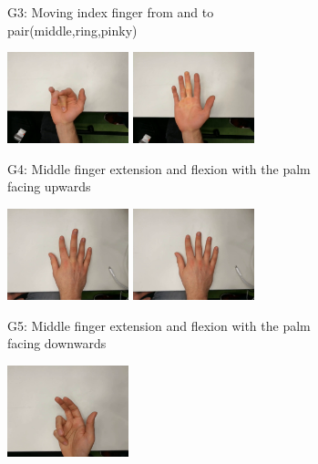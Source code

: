 \begin{figure}
\begin{subfigure}[t]{0.5\linewidth}
  \caption{G3: Moving index finger from and to pair(middle,ring,pinky)}
  \end{subfigure}
  \hspace*{\fill}
  \begin{subfigure}[t]{0.5\linewidth}
  \includegraphics[width=100pt]{figures/ext_middle1}
  \includegraphics[width=100pt]{figures/flx_middle1}
  \caption{G4: Middle finger extension and flexion with the palm facing upwards}
  \end{subfigure}\par\medskip
  \begin{subfigure}[t]{0.5\linewidth}
  \includegraphics[width=100pt]{figures/ext_middle2}
  \includegraphics[width=100pt]{figures/flx_middle2}
  \caption{G5: Middle finger extension and flexion with the palm facing downwards}
  \end{subfigure}
  \hspace*{\fill}
  \begin{subfigure}[t]{0.5\linewidth}
  \includegraphics[width=100pt]{figures/ext_pinky1}

\end{subfigure}
\end{figure}
